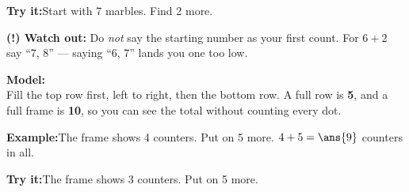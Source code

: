 \documentclass[12pt]{article}
\begin{document}
\begin{tryitbox}
\textbf{Try it:}\quad Start with 7 marbles. Find 2 more.\\[2pt]
\end{tryitbox}

\begin{watchoutbox}
\textbf{(!) Watch out:} Do \emph{not} say the starting number as your first
count. For $6 + 2$ say ``7, 8'' --- saying ``6, 7'' lands you one too low.
\end{watchoutbox}


\begin{formulabox}
\textbf{Model:}\\[4pt]
Fill the top row first, left to right, then the bottom row. A full row is
\textbf{5}, and a full frame is \textbf{10}, so you can see the total without
counting every dot.
\end{formulabox}

\begin{examplebox}
\textbf{Example:}\quad The frame shows 4 counters. Put on 5 more.
$4 + 5 = \ans{9}$ counters in all.
\end{examplebox}

\begin{tryitbox}
\textbf{Try it:}\quad The frame shows 3 counters. Put on 5 more.\\[2pt]
\end{tryitbox}
\end{document}
